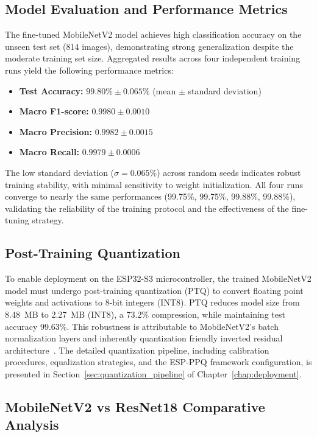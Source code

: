 \subsection{Model Evaluation and Performance Metrics}

The fine-tuned MobileNetV2 model achieves high classification accuracy on the unseen test set (814 images), demonstrating strong generalization despite the moderate training set size. Aggregated results across four independent training runs yield the following performance metrics:

\begin{itemize}
    \item \textbf{Test Accuracy:} $99.80\% \pm 0.065\%$ (mean $\pm$ standard deviation)
    \item \textbf{Macro F1-score:} $0.9980 \pm 0.0010$
    \item \textbf{Macro Precision:} $0.9982 \pm 0.0015$
    \item \textbf{Macro Recall:} $0.9979 \pm 0.0006$
\end{itemize}

The low standard deviation ($\sigma = 0.065\%$) across random seeds indicates robust training stability, with minimal sensitivity to weight initialization. All four runs converge to nearly the same performances (99.75\%, 99.75\%, 99.88\%, 99.88\%), validating the reliability of the training protocol and the effectiveness of the fine-tuning strategy.

\subsection{Post-Training Quantization}

To enable deployment on the ESP32-S3 microcontroller, the trained MobileNetV2 model must undergo post-training quantization (PTQ) to convert floating point weights and activations to 8-bit integers (INT8). PTQ reduces model size from 8.48~MB to 2.27~MB (INT8), a 73.2\% compression, while maintaining test accuracy 99.63\%. This robustness is attributable to MobileNetV2's batch normalization layers and inherently quantization friendly inverted residual architecture~\cite{jacob2018quantization}. The detailed quantization pipeline, including calibration procedures, equalization strategies, and the ESP-PPQ framework configuration, is presented in Section~\ref{sec:quantization_pipeline} of Chapter~\ref{chap:deployment}.

\subsection{MobileNetV2 vs ResNet18 Comparative Analysis}

